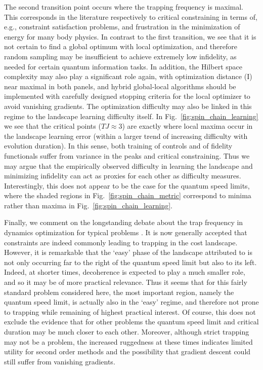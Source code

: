 \documentclass[aps, twocolumn,superscriptaddress]{revtex4-1}
\begin{document}
The second transition point occurs where the trapping frequency is maximal.  This corresponds in the literature respectively to critical constraining in terms of, e.g., constraint satisfaction problems, and frustration in the minimization of energy for many body physics.  In contrast to the first transition, we see that it is not certain to find a global optimum with local optimization, and therefore random sampling may be insufficient to achieve extremely low infidelity, as needed for certain quantum information tasks. In addition, the Hilbert space complexity may also play a significant role again, with optimization distance (I) near maximal in both panels, and hybrid global-local algorithms \cite{dalgaard2020global} should be implemented with carefully designed stopping criteria for the local optimizer to avoid vanishing gradients. The optimization difficulty may also be linked in this regime to the landscape learning difficulty itself. In Fig.~\ref{fig:spin_chain_learning} we see that the critical points ($TJ\approx3$) are exactly where local maxima occur in the landscape learning error (within a larger trend of increasing difficulty with evolution duration).  In this sense, both training of controls and of fidelity functionals suffer from variance in the peaks and critical constraining. Thus we may argue that the empirically observed difficulty in learning the landscape and minimizing infidelity can act as proxies for each other as difficulty measures.  Interestingly, this does not appear to be the case for the quantum speed limits, where the shaded regions in Fig.~\ref{fig:spin_chain_metric} correspond to minima rather than maxima in Fig.~\ref{fig:spin_chain_learning}.

Finally, we comment on the longstanding debate about the trap frequency in dynamics optimization for typical problems \cite{rabitz2004quantum, pechen2011there, werschnik2007quantum, brif2010control, caneva2011chopped, Larocca_2018,bukov2018reinforcement}.  It is now generally accepted that constraints are indeed commonly leading to trapping in the cost landscape. However, it is remarkable that the `easy' phase of the landscape attributed to \cite{rabitz2004quantum} is not only occurring far to the right of the quantum speed limit but also to its left. Indeed, at shorter times, decoherence is expected to play a much smaller role, and so it may be of more practical relevance. Thus it seems that for this fairly standard problem considered here, the most important region, namely the quantum speed limit, is actually also in the `easy' regime, and therefore not prone to trapping while remaining of highest practical interest. Of course, this does not exclude the evidence that for other problems the quantum speed limit and critical duration may be much closer to each other. Moreover, although strict trapping may not be a problem, the increased ruggedness at these times indicates limited utility for second order methods and the possibility that gradient descent could still suffer from vanishing gradients.
\end{document}
